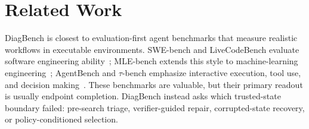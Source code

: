 \section{Related Work}
\label{sec:related_work}

DiagBench is closest to evaluation-first agent benchmarks that measure realistic workflows in executable environments. SWE-bench and LiveCodeBench evaluate software engineering ability~\citep{jimenez2024swebench,jain2024livecodebench}; MLE-bench extends this style to machine-learning engineering~\citep{chan2025mlebench}; AgentBench and $\tau$-bench emphasize interactive execution, tool use, and decision making~\citep{liu2024agentbench,yao2024taubench}. These benchmarks are valuable, but their primary readout is usually endpoint completion. DiagBench instead asks which trusted-state boundary failed: pre-search triage, verifier-guided repair, corrupted-state recovery, or policy-conditioned selection.

\begin{table}[t]
\centering
\footnotesize
\setlength{\tabcolsep}{4.5pt}
\renewcommand{\arraystretch}{1.12}
\caption{Comparison with representative agent and engineering benchmarks. A filled dot denotes a dedicated evaluation target, a triangle denotes partial or indirect coverage, and an open circle denotes that the property is not a dedicated target.}
\label{tab:benchmark_scope_comparison}
\end{table}

